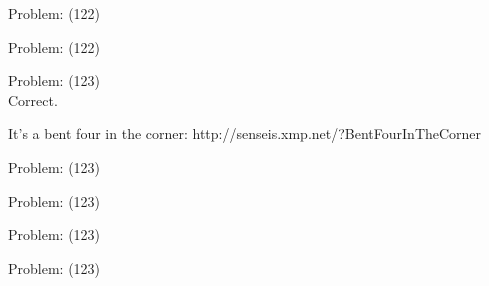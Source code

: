 \documentclass[11pt]{article}
\begin{document}
\begin{minipage}[t]{0.5\textwidth}
  {\centering
  
  Problem: (122)\\
  
  }
\end{minipage}
\begin{minipage}[t]{0.5\textwidth}
  {\centering
  
  Problem: (122)\\
  
  }
\end{minipage}
\begin{minipage}[t]{0.5\textwidth}
  {\centering
  
  Problem: (123)\\
  Correct.

It's a bent four in the corner: http://senseis.xmp.net/?BentFourInTheCorner\\
  }
\end{minipage}
\begin{minipage}[t]{0.5\textwidth}
  {\centering
  
  Problem: (123)\\
  
  }
\end{minipage}
\begin{minipage}[t]{0.5\textwidth}
  {\centering
  
  Problem: (123)\\
  
  }
\end{minipage}
\begin{minipage}[t]{0.5\textwidth}
  {\centering
  
  Problem: (123)\\
  
  }
\end{minipage}
\begin{minipage}[t]{0.5\textwidth}
  {\centering
  
  Problem: (123)\\
  
  }
\end{minipage}
\end{document}
